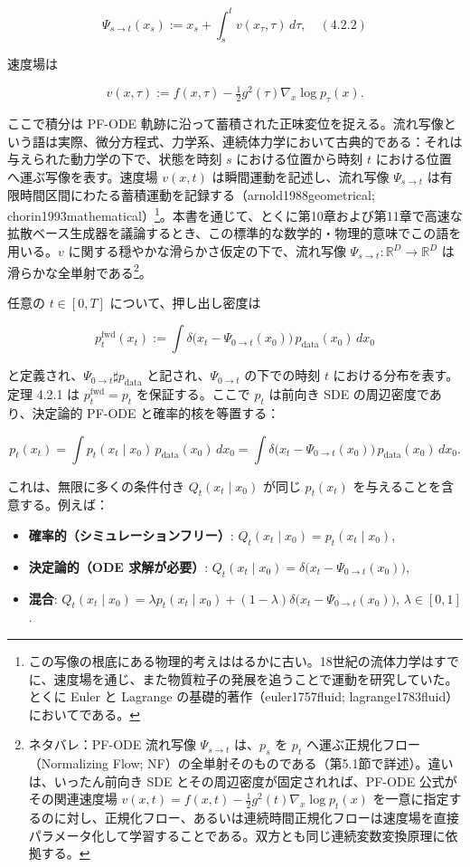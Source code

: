 \[
\Psi_{s\to t}(x_s) := x_s + \int_s^t v(x_\tau,\tau)\, d\tau, \quad (4.2.2)
\]


速度場は

\[
v(x,\tau):=f(x,\tau)-\tfrac12 g^2(\tau)\nabla_x\log p_\tau(x).
\]


ここで積分は PF-ODE 軌跡に沿って蓄積された正味変位を捉える。流れ写像という語は実際、微分方程式、力学系、連続体力学において古典的である：それは与えられた動力学の下で、状態を時刻 $s$ における位置から時刻 $t$ における位置へ運ぶ写像を表す。速度場 $v(x,t)$ は瞬間運動を記述し、流れ写像 $\Psi_{s\to t}$ は有限時間区間にわたる蓄積運動を記録する（arnold1988geometrical; chorin1993mathematical）\footnote{この写像の根底にある物理的考えははるかに古い。18世紀の流体力学はすでに、速度場を通じ、また物質粒子の発展を追うことで運動を研究していた。とくに Euler と Lagrange の基礎的著作（euler1757fluid; lagrange1783fluid）においてである。}。本書を通じて、とくに第10章および第11章で高速な拡散ベース生成器を議論するとき、この標準的な数学的・物理的意味でこの語を用いる。$v$ に関する穏やかな滑らかさ仮定の下で、流れ写像 $\Psi_{s\to t}:\mathbb{R}^D\to\mathbb{R}^D$ は滑らかな全単射である\footnote{ネタバレ：PF-ODE 流れ写像 $\Psi_{s\to t}$ は、$p_s$ を $p_t$ へ運ぶ正規化フロー（Normalizing Flow; NF）の全単射そのものである（第5.1節で詳述）。違いは、いったん前向き SDE とその周辺密度が固定されれば、PF-ODE 公式がその関連速度場 $v(x,t)=f(x,t)-\tfrac12 g^2(t)\nabla_x\log p_t(x)$ を一意に指定するのに対し、正規化フロー、あるいは連続時間正規化フローは速度場を直接パラメータ化して学習することである。双方とも同じ連続変数変換原理に依拠する。}。

任意の $t\in[0,T]$ について、押し出し密度は

\[
p_t^{\mathrm{fwd}}(x_t) := \int \delta\bigl(x_t-\Psi_{0\to t}(x_0)\bigr)\, p_{\mathrm{data}}(x_0)\, dx_0
\]


と定義され、$\Psi_{0\to t}\sharp p_{\mathrm{data}}$ と記され、$\Psi_{0\to t}$ の下での時刻 $t$ における分布を表す。定理 4.2.1 は $p_t^{\mathrm{fwd}}=p_t$ を保証する。ここで $p_t$ は前向き SDE の周辺密度であり、決定論的 PF-ODE と確率的核を等置する：

\[
p_t(x_t)=\int p_t(x_t\mid x_0)\, p_{\mathrm{data}}(x_0)\, dx_0
=\int \delta\bigl(x_t-\Psi_{0\to t}(x_0)\bigr)\, p_{\mathrm{data}}(x_0)\, dx_0.
\]


これは、無限に多くの条件付き $Q_t(x_t\mid x_0)$ が同じ $p_t(x_t)$ を与えることを含意する。例えば：

\begin{itemize}
\item \textbf{確率的（シミュレーションフリー）}: $Q_t(x_t\mid x_0)=p_t(x_t\mid x_0)$,
\item \textbf{決定論的（ODE 求解が必要）}: $Q_t(x_t\mid x_0)=\delta\bigl(x_t-\Psi_{0\to t}(x_0)\bigr)$,
\item \textbf{混合}: $Q_t(x_t\mid x_0)=\lambda p_t(x_t\mid x_0)+(1-\lambda)\delta\bigl(x_t-\Psi_{0\to t}(x_0)\bigr)$, $\lambda\in[0,1]$.
\end{itemize}


